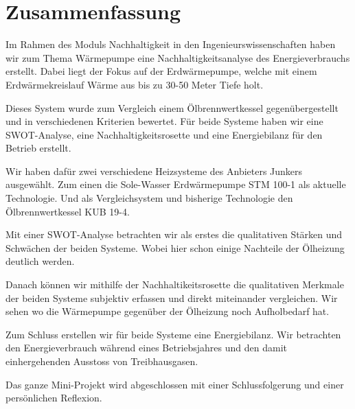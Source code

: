 \chapter*{Zusammenfassung}
\label{chap:zusammenfassung}

Im Rahmen des Moduls \glqq Nachhaltigkeit in den Ingenieurswissenschaften\grqq{} haben wir zum Thema Wärmepumpe eine Nachhaltigkeitsanalyse des Energieverbrauchs erstellt. Dabei liegt der Fokus auf der Erdwärmepumpe, welche mit einem Erdwärmekreislauf Wärme aus bis zu 30-50 Meter Tiefe holt.

Dieses System wurde zum Vergleich einem Ölbrennwertkessel gegenübergestellt und in verschiedenen Kriterien bewertet. Für beide Systeme haben wir eine SWOT-Analyse, eine Nachhaltigkeitsrosette und eine Energiebilanz für den Betrieb erstellt.

Wir haben dafür zwei verschiedene Heizsysteme des Anbieters Junkers ausgewählt.
Zum einen die Sole-Wasser Erdwärmepumpe \glqq STM 100-1\grqq{} als aktuelle Technologie.
Und als Vergleichsystem und bisherige Technologie den Ölbrennwertkessel \glqq KUB 19-4\grqq{}.

Mit einer SWOT-Analyse betrachten wir als erstes die qualitativen Stärken und
Schwächen der beiden Systeme. Wobei hier schon einige Nachteile der Ölheizung
deutlich werden.

Danach können wir mithilfe der Nachhaltikeitsrosette die qualitativen Merkmale
der beiden Systeme subjektiv erfassen und direkt miteinander vergleichen.
Wir sehen wo die Wärmepumpe gegenüber der Ölheizung noch Aufholbedarf hat.

Zum Schluss erstellen wir für beide Systeme eine Energiebilanz.
Wir betrachten den Energieverbrauch während eines Betriebsjahres und den
damit einhergehenden Ausstoss von Treibhausgasen.

Das ganze Mini-Projekt wird abgeschlossen mit einer Schlussfolgerung und einer persönlichen Reflexion.



